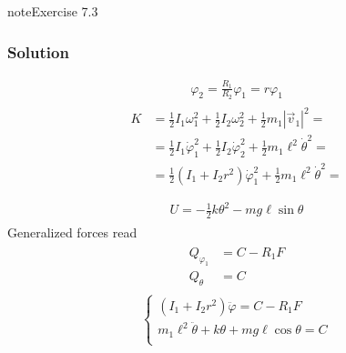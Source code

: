 \documentclass[letterpaper,10pt,english]{jupyterBook}
\begin{document}
 \label{exercise:ch/exercises-dynamics-exercise-2}

\begin{sphinxadmonition}{note}{Exercise 7.3}


\end{sphinxadmonition}
\subsubsection*{Solution}

\sphinxAtStartPar
{}  
\begin{equation*}
\begin{split}\varphi_2 = \frac{R_1}{R_2} \varphi_1 = r \varphi_1\end{split}
\end{equation*}
\sphinxAtStartPar
{}
\begin{equation*}
\begin{split}\begin{aligned}
K 
& = \frac{1}{2} I_1 \omega_1^2 + \frac{1}{2} I_2 \omega_2^2 + \frac{1}{2} m_1 |\vec{v}_1|^2 = \\
& = \frac{1}{2} I_1 \dot{\varphi}_1^2 + \frac{1}{2} I_2 \dot{\varphi}_2^2 + \frac{1}{2} m_1 \ell^2 \dot{\theta}^2 = \\
& = \frac{1}{2} \left( I_1 + I_2 r^2 \right) \dot{\varphi}_1^2 + \frac{1}{2} m_1 \ell^2 \dot{\theta}^2 = \\
\end{aligned}\end{split}
\end{equation*}\begin{equation*}
\begin{split}\begin{aligned}
  U = - \frac{1}{2} k \theta^2 - m g \ell \sin \theta
\end{aligned}\end{split}
\end{equation*}
\sphinxAtStartPar
Generalized forces read
\begin{equation*}
\begin{split}\begin{aligned}
  Q_{\varphi_1} & = C - R_1 F \\
  Q_{\theta} & = C
\end{aligned}\end{split}
\end{equation*}
\sphinxAtStartPar
{}
\begin{equation*}
\begin{split}\begin{cases}
  \left( I_1 + I_2 r^2 \right) \ddot{\varphi} = C - R_1 F \\
  m_1 \ell^2 \ddot{\theta} + k \theta + m g \ell \cos \theta = C \\
\end{cases}\end{split}
\end{equation*}
\end{document}
